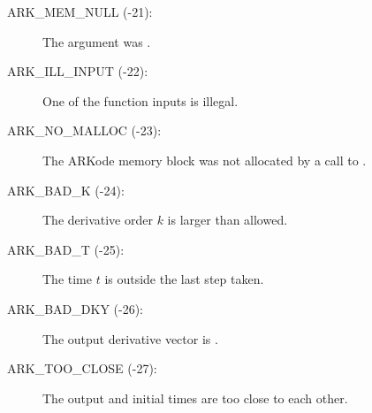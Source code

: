 \documentclass[letterpaper,10pt,english]{sphinxmanual}
\begin{document}
\begin{description}
\item[{ARK\_MEM\_NULL  (-21):}] \leavevmode
The  argument was .

\item[{ARK\_ILL\_INPUT  (-22):}] \leavevmode
One of the function inputs is illegal.

\item[{ARK\_NO\_MALLOC  (-23):}] \leavevmode
The ARKode memory block was not allocated by
a call to .

\item[{ARK\_BAD\_K  (-24):}] \leavevmode
The derivative order \(k\) is larger than allowed.

\item[{ARK\_BAD\_T  (-25):}] \leavevmode
The time \(t\) is outside the last step taken.

\item[{ARK\_BAD\_DKY  (-26):}] \leavevmode
The output derivative vector is .

\item[{ARK\_TOO\_CLOSE  (-27):}] \leavevmode
The output and initial times are too close to
each other.

\end{description}
\end{document}
